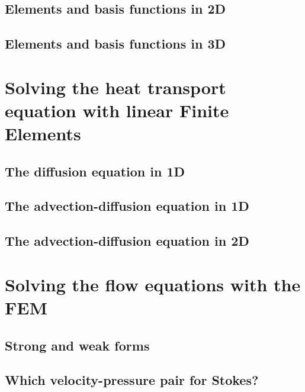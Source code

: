 \documentclass[a4paper]{article}
\begin{document}
\subsection{Elements and basis functions in 2D}\label{sec:shpfct2d}  %
\subsection{Elements and basis functions in 3D}  %

\newpage 
\section{Solving the heat transport equation with linear Finite Elements} %
\subsection{The diffusion equation in 1D} \label{sec:diff1D}  %
\subsection{The advection-diffusion equation in 1D} \label{sec:advec-diff1D} %
\subsection{The advection-diffusion equation in 2D}  %

\newpage 
\section{Solving the flow equations with the FEM} \label{solvingFEM} %
\subsection{Strong and weak forms}  %
\subsection{Which velocity-pressure pair for Stokes?}  %
\end{document}
